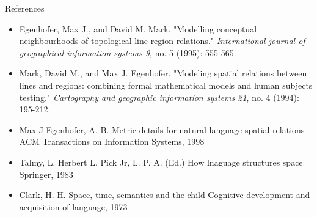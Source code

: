 \documentclass{beamer}
\begin{document}
	\begin{comment}
		- citing style chicago
		- sorted by relevance
	\end{comment}
	\begin{frame}{References}
		\begin{itemize}
			\item Egenhofer, Max J., and David M. Mark. "Modelling conceptual neighbourhoods of topological line-region relations." \textit{International journal of geographical information systems 9}, no. 5 (1995): 555-565.
			
			\item Mark, David M., and Max J. Egenhofer. "Modeling spatial relations between lines and regions: combining formal mathematical models and human subjects testing." \textit{Cartography and geographic information systems 21}, no. 4 (1994): 195-212.
			
			\item Max J Egenhofer, A. B. Metric details for natural language spatial relations ACM Transactions on Information Systems, 1998

			\item Talmy, L. Herbert L. Pick Jr, L. P. A. (Ed.) How lnaguage structures space Springer, 1983

			\item Clark, H. H. Space, time, semantics and the child Cognitive development and acquisition of language, 1973
		\end{itemize}
	\end{frame}
	
\end{document}
